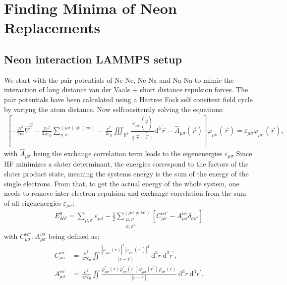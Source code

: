 
\chapter{Finding Minima of Neon Replacements}
\label{chap:Erstes Kapitel}
\section{Neon interaction LAMMPS setup}
We start with the pair potentials of Ne-Ne, Ne-Na and Na-Na to mimic the interaction of long distance van der Vaals + short distance repulsion forces. The pair potentials have been calculated using a Hartree Fock self consitent field cycle by variyng the atom distance. Now selfconsitently solving the equations:\\
\begin{align}
	\left[-\frac{\hbar^2}{2m}\vec{\nabla}^2-\frac{Ze^2}{4\pi\varepsilon_0}\sum_{\nu,\sigma}^{(\mu\sigma)\neq(\nu\sigma)}-\frac{e^2}{4\varepsilon_0}\iiint_{\mathbb{R}^3}\frac{\varphi_{\nu\sigma'}(\tilde{\vec{r}})}{\|\vec{r}-\tilde{\vec{r}}\|}\mathrm{d}^3\tilde{\vec{r}}-\hat{A}_{\mu\sigma}(\vec{r})\right]\varphi_{\mu\sigma}(\vec{r})=\varepsilon_{\mu\sigma}\varphi_{\mu\sigma}(\vec{r}),
\end{align}
with $\hat{A}_{\mu\sigma}$ being the exchange correlation term leads to the eigenenergies $\varepsilon_{\mu\sigma}$ Since \ac{HF} 
minimizes a slater determinant, the energies correspond to the factors of the slater product state, meaning the systems energy is the sum of the energy of the single electrons. From that, to get the actual energy of the whole system, one needs to remove inter-electron repulsion and exchange correlation from the sum of all eigenenergies $\varepsilon_{\mu\sigma}$:
\begin{align}
	E_{HF}^0 = \sum_{\mu,\sigma}\varepsilon_{\mu\sigma}-\frac{1}{2}\sum_{\substack{\mu,\nu\\\sigma,\sigma'}}^{(\mu\sigma\neq\nu\sigma)}\left[C_{\mu\sigma}^{\nu\sigma'}-A_{\mu\sigma}^{\nu\sigma}\delta_{\sigma\sigma'}\right]
\end{align}
with $C_{\mu\sigma}^{\nu\sigma'},A_{\mu\sigma}^{\nu\sigma}$ being defined as:
\begin{align}
	C_{\mu \sigma}^{v \sigma^{\prime}}&=\frac{e^2}{4 \pi \varepsilon_0} \iint  \frac{\left|\varphi_{\mu \sigma}(r)\right|^2\left|\varphi_{v \sigma^{\prime}}\left(r^{\prime}\right)\right|^2}{\left|r-r^{\prime}\right|}\mathrm{~d}^3 r \mathrm{~d}^3 r^{\prime},
	\\
	A_{\mu \sigma}^{v \sigma}&=\frac{e^2}{4 \pi \varepsilon_0} \iint \frac{\varphi_{\mu \sigma}^*(r) \varphi_{v \sigma}^*\left(r^{\prime}\right) \varphi_{\mu \sigma}\left(r^{\prime}\right) \varphi_{v \sigma}(r)}{\left|r-r^{\prime}\right|} \mathrm{~d}^3 r \mathrm{~d}^3 r^{\prime}.
\end{align}
